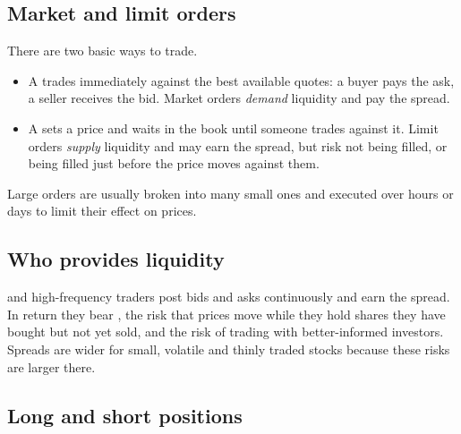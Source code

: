 
\subsection{Market and limit orders}

There are two basic ways to trade.

\begin{itemize}
  \item A  trades immediately against the best available quotes: a buyer pays the ask, a seller receives the bid. Market orders \emph{demand} liquidity and pay the spread.
  \item A  sets a price and waits in the book until someone trades against it. Limit orders \emph{supply} liquidity and may earn the spread, but risk not being filled, or being filled just before the price moves against them.
\end{itemize}

Large orders are usually broken into many small ones and executed over hours or days to limit their effect on prices.

\subsection{Who provides liquidity}

 and high-frequency traders post bids and asks continuously and earn the spread. In return they bear , the risk that prices move while they hold shares they have bought but not yet sold, and the risk of trading with better-informed investors. Spreads are wider for small, volatile and thinly traded stocks because these risks are larger there.

\subsection{Long and short positions}

